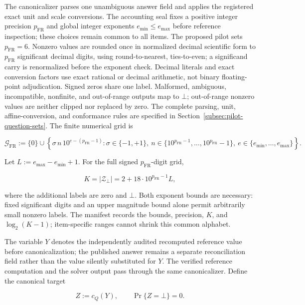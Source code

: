\documentclass[10pt]{article} %
\providecommand{\1}{\mathbf{1}}  %
\theoremstyle{remark}
\theoremstyle{definition}
\begin{document}
The canonicalizer parses one unambiguous answer field and applies the
registered exact unit and scale conversions. The accounting seal fixes a
positive integer precision $p_{\mathrm{FR}}$ and global integer exponents
$e_{\min}\leq e_{\max}$ before reference inspection; these choices remain
common to all items. The proposed pilot sets $p_{\mathrm{FR}}=6$. Nonzero
values are rounded once in normalized decimal scientific form to
$p_{\mathrm{FR}}$ significant decimal digits, using round-to-nearest,
ties-to-even; a significand carry is
renormalized before the exponent check. Decimal literals and exact
conversion factors use exact rational or decimal arithmetic, not binary
floating-point adjudication. Signed zeros share one label. Malformed,
ambiguous, incompatible, nonfinite, and out-of-range outputs map to
$\bot$; out-of-range nonzero values are neither clipped nor replaced by
zero. The complete parsing, unit, affine-conversion, and conformance
rules are specified in Section~\ref{subsec:pilot-question-sets}.
The finite numerical grid is

\begin{equation}
\mathcal G_{\mathrm{FR}}
:=
\{0\}
\cup
\left\{
\sigma\,n\,10^{e-(p_{\mathrm{FR}}-1)}:
\sigma\in\{-1,+1\},\ 
n\in\{10^{p_{\mathrm{FR}}-1},\ldots,10^{p_{\mathrm{FR}}}-1\},\ 
e\in\{e_{\min},\ldots,e_{\max}\}
\right\}.
\end{equation}

Let $L:=e_{\max}-e_{\min}+1$. For the full signed
$p_{\mathrm{FR}}$-digit grid,

\begin{equation}
K=|\mathcal Z_{\bot}|=2+18\cdot10^{p_{\mathrm{FR}}-1}L,
\label{eq:theory-canonical-alphabet-size}
\end{equation}

where the additional labels are zero and $\bot$. Both exponent bounds
are necessary: fixed significant digits and an upper magnitude bound
alone permit arbitrarily small nonzero labels. The manifest records the
bounds, precision, $K$, and $\log_2(K-1)$; item-specific ranges cannot shrink this
common alphabet.

The variable $Y$ denotes the independently audited recomputed reference value before canonicalization; the published answer remains a separate reconciliation field rather than the value silently substituted for $Y$. The verified reference computation and the solver output pass through the same canonicalizer. Define the canonical target

\begin{equation}
Z:=c_Q(Y),
\qquad
\Pr\{Z=\bot\}=0.
\label{eq:theory-canonical-target}
\end{equation}
\end{document}
